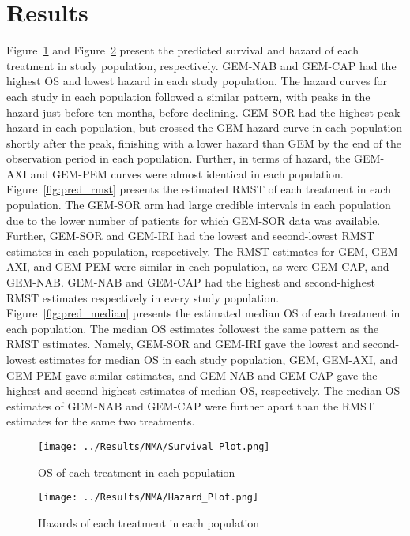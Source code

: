 \section{Results}
Figure~\ref{fig:pred_surv} and Figure~\ref{fig:pred_hazard} present the predicted survival and hazard of each treatment in study population, respectively. GEM-NAB and GEM-CAP had the highest OS and lowest hazard in each study population. The hazard curves for each study in each population followed a similar pattern, with peaks in the hazard just before ten months, before declining. GEM-SOR had the highest peak-hazard in each population, but crossed the GEM hazard curve in each population shortly after the peak, finishing with a lower hazard than GEM by the end of the observation period in each population. Further, in terms of hazard, the GEM-AXI and GEM-PEM curves were almost identical in each population. \\

Figure~\ref{fig:pred_rmst} presents the estimated RMST of each treatment in each population. The GEM-SOR arm had large credible intervals in each population due to the lower number of patients for which GEM-SOR data was available. Further, GEM-SOR and GEM-IRI had the lowest and second-lowest RMST estimates in each population, respectively. The RMST estimates for GEM, GEM-AXI, and GEM-PEM were similar in each population, as were GEM-CAP, and GEM-NAB. GEM-NAB and GEM-CAP had the highest and second-highest RMST estimates respectively in every study population. \\

Figure~\ref{fig:pred_median} presents the estimated median OS of each treatment in each population. The median OS estimates followest the same pattern as the RMST estimates. Namely, GEM-SOR and GEM-IRI gave the lowest and second-lowest estimates for median OS in each study population, GEM, GEM-AXI, and GEM-PEM gave similar estimates, and GEM-NAB and GEM-CAP gave the highest and second-highest estimates of median OS, respectively. The median OS estimates of GEM-NAB and GEM-CAP were further apart than the RMST estimates for the same two treatments. 

\begin{figure}[h]
    \centering
    \texttt{[image: ../Results/NMA/Survival\_Plot.png]}
    \caption{OS of each treatment in each population}
    \label{fig:pred_surv}
\end{figure}

\begin{figure}[h]
    \centering
    \texttt{[image: ../Results/NMA/Hazard\_Plot.png]}
    \caption{Hazards of each treatment in each population}
    \label{fig:pred_hazard}
\end{figure}

